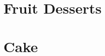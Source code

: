 \documentclass[twoside, openany]{book}
\newcommand{\dish}[1]{}
\begin{document}
\dish{Cherry_pie}

\dish{Rhubarb_pie}

\dish{Blueberry_tart}



\section{Fruit Desserts}

\dish{Baked_apples}

\dish{Berry_crumble}

\dish{Rhubarb_sauce}

\dish{Lemon_bars}

\dish{Cherry_raspberry_sorbet}

\dish{Berry_jam}


\section{Cake}

\dish{Chocolate_cake}

\dish{Buttercream_frosting}

\dish{Cranberry_cake}

\dish{Raspberry_cheesecake}
\end{document}
